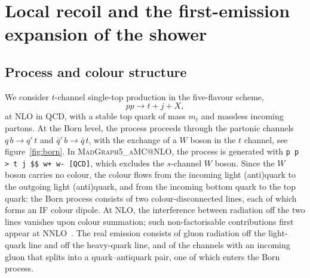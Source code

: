 \documentclass[a4paper,11pt]{article}
\makeatletter
\newcommand{\mgamc}{\textsc{MadGraph5\_aMC@NLO}\xspace}
\newcommand{\code}[1]{\texttt{#1}}
\makeatother
\begin{document}
\section{Local recoil and the first-emission expansion of the shower}
\label{sec:recoil}

\subsection{Process and colour structure}
\label{sec:process}

We consider $t$-channel single-top production in the five-flavour
scheme,
\begin{equation}
  pp\to t+j+X,
  \label{eq:process}
\end{equation}
at NLO in QCD, with a stable top quark of mass $m_t$ and massless
incoming partons. At the Born level, the process proceeds through the
partonic channels $q\,b\to q'\,t$ and $\bar q'\,b\to \bar q\,t$, with
the exchange of a $W$ boson in the $t$ channel, see
figure~\ref{fig:born}. In \mgamc, the process is generated with
\code{p p > t j \$\$ w+ w- [QCD]}, which excludes the $s$-channel $W$
boson. Since the $W$ boson carries no colour, the colour flows
from the incoming light (anti)quark to the outgoing light
(anti)quark, and from the incoming bottom quark to the top quark: the
Born process consists of two colour-disconnected lines, each of which
forms an IF colour dipole. At NLO, the interference between radiation
off the two lines vanishes upon colour summation; such
non-factorisable contributions first appear at
NNLO~\cite{Bronnum-Hansen:2022tmr}. The real emission
consists of gluon radiation off the light-quark line and off the
heavy-quark line, and of the channels with an incoming gluon that
splits into a quark--antiquark pair, one of which enters the Born
process.
\end{document}
